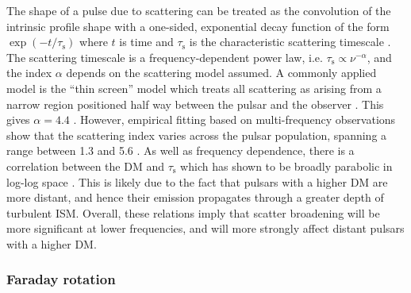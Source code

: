 The shape of a pulse due to scattering can be treated as the convolution of the intrinsic profile shape with a one-sided, exponential decay function of the form $\exp{(-t/\tau_\mathrm{s})}$ where $t$ is time and $\tau_\mathrm{s}$ is the characteristic scattering timescale \citep{Sxxx1968}. The scattering timescale is a frequency-dependent power law, i.e. $\tau_\mathrm{s} \propto \nu^{-\alpha}$, and the index $\alpha$ depends on the scattering model assumed. A commonly applied model is the ``thin screen'' model which treats all scattering as arising from a narrow region positioned half way between the pulsar and the observer \citep[e.g.][]{Sxxx1968, Wxxx1972}. This gives $\alpha = 4.4$ \citep{Rxxx1977}. However, empirical fitting based on multi-frequency observations show that the scattering index varies across the pulsar population, spanning a range between 1.3 and 5.6 \citep{SDOx1980,LMG+2004, LDKK2013, LKKx2015, GKK+2017}. As well as frequency dependence, there is a correlation between the DM and $\tau_\mathrm{s}$ which has shown to be broadly parabolic in log-log space \citep[e.g.][]{BCC+2004,GKK+2017,IJWx2019}. This is likely due to the fact that pulsars with a higher DM are more distant, and hence their emission propagates through a greater depth of turbulent ISM. Overall, these relations imply that scatter broadening will be more significant at lower frequencies, and will more strongly affect distant pulsars with a higher DM.


\subsubsection{Faraday rotation}
\label{sec: intro - observation processing - ISM effects - faraday rotation}

